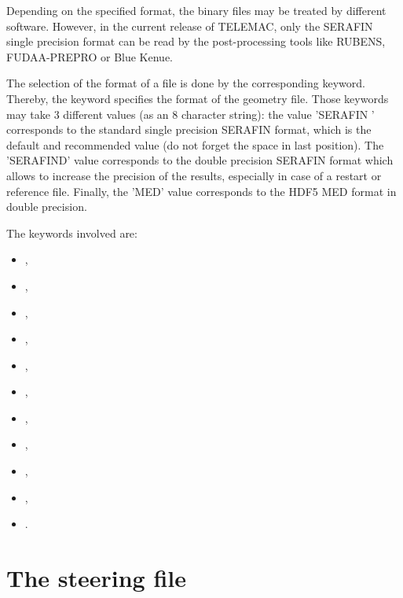 Depending on the specified format, the binary files may be treated by different
software. However, in the current release of TELEMAC, only the SERAFIN single
precision format can be read by the post-processing tools like RUBENS,
FUDAA-PREPRO or Blue Kenue.

The selection of the format of a file is done by the corresponding keyword.
Thereby, the keyword  specifies the format of the
geometry file. Those keywords may take 3 different values (as an 8 character
string): the value 'SERAFIN ' corresponds to the standard single precision
SERAFIN format, which is the default and recommended value (do not forget the
space in last position). The 'SERAFIND' value corresponds to the double
precision SERAFIN format which allows to increase the precision of the results,
especially in case of a restart or reference file. Finally, the 'MED' value
corresponds to the HDF5 MED format in double precision.

The keywords involved are:

\begin{itemize}
\item {},

\item {},

\item {},

\item {},

\item {},

\item {},

\item {},

\item {},

\item {},

\item {},

\item {}.
\end{itemize}

\section{The steering file}

